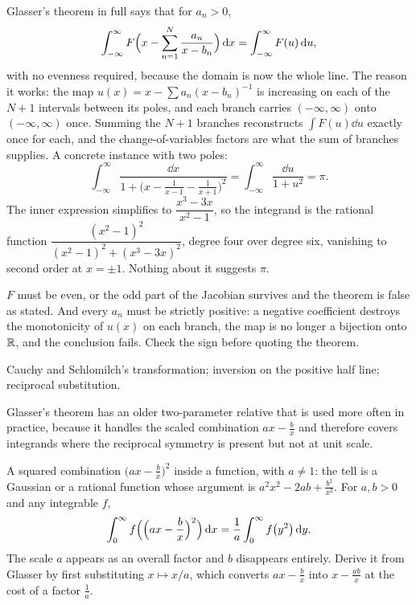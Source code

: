 \begin{keynote}
Glasser's theorem in full says that for $a_n>0$,
\[\int_{-\infty}^{\infty}F\Bigl(x-\sum_{n=1}^{N}\frac{a_n}{x-b_n}\Bigr)\,\mathrm{d} x=\int_{-\infty}^{\infty}F(u)\,\mathrm{d} u,\]
with no evenness required, because the domain is now the whole line. The reason it works: the map $u(x)=x-\sum a_n(x-b_n)^{-1}$ is increasing on each of the $N+1$ intervals between its poles, and each branch carries $(-\infty,\infty)$ onto $(-\infty,\infty)$ once. Summing the $N+1$ branches reconstructs $\int F(u)\dd u$ exactly once for each, and the change-of-variables factors are what the sum of branches supplies. A concrete instance with two poles:
\[\int_{-\infty}^{\infty}\frac{\dd x}{1+\bigl(x-\tfrac{1}{x-1}-\tfrac{1}{x+1}\bigr)^{2}}=\int_{-\infty}^{\infty}\frac{\dd u}{1+u^{2}}=\pi.\]
The inner expression simplifies to $\dfrac{x^{3}-3x}{x^{2}-1}$, so the integrand is the rational function $\dfrac{(x^{2}-1)^{2}}{(x^{2}-1)^{2}+(x^{3}-3x)^{2}}$, degree four over degree six, vanishing to second order at $x=\pm1$. Nothing about it suggests $\pi$.
\end{keynote}

\begin{trap}
$F$ must be even, or the odd part of the Jacobian survives and the theorem is false as stated. And every $a_n$ must be strictly positive: a negative coefficient destroys the monotonicity of $u(x)$ on each branch, the map is no longer a bijection onto $\mathbb{R}$, and the conclusion fails. Check the sign before quoting the theorem.
\end{trap}

\begin{seealsob}Cauchy and Schlomilch's transformation; inversion on the positive half line; reciprocal substitution.\end{seealsob}

Glasser's theorem has an older two-parameter relative that is used more often in practice, because it handles the scaled combination $ax-\tfrac bx$ and therefore covers integrands where the reciprocal symmetry is present but not at unit scale.

\cue A squared combination $\bigl(ax-\tfrac bx\bigr)^{2}$ inside a function, with $a\neq1$: the tell is a Gaussian or a rational function whose argument is $a^{2}x^{2}-2ab+\tfrac{b^{2}}{x^{2}}$.
\method For $a,b>0$ and any integrable $f$,
\[\int_0^{\infty}f\Bigl(\Bigl(ax-\frac bx\Bigr)^{2}\Bigr)\,\mathrm{d} x=\frac1a\int_0^{\infty}f\bigl(y^{2}\bigr)\,\mathrm{d} y.\]
The scale $a$ appears as an overall factor and $b$ disappears entirely. Derive it from Glasser by first substituting $x\mapsto x/a$, which converts $ax-\tfrac bx$ into $x-\tfrac{ab}{x}$ at the cost of a factor $\tfrac1a$.

